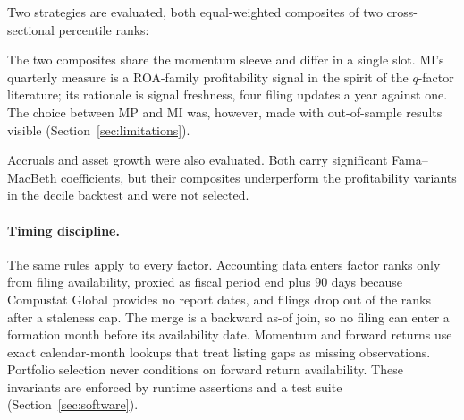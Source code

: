 \documentclass[11pt,a4paper]{article}
\begin{document}
Two strategies are evaluated, both equal-weighted composites of
two cross-sectional percentile ranks:

\begin{center}
\end{center}

The two composites share the momentum sleeve and differ in a single
slot. MI's quarterly measure is a ROA-family profitability signal in the
spirit of the $q$-factor literature; its rationale is signal freshness,
four filing updates a year against one. The choice between MP and MI
was, however, made with out-of-sample results visible
(Section~\ref{sec:limitations}).

Accruals \citep{sloan1996} and asset growth \citep{cooper2008} were also
evaluated. Both carry significant Fama--MacBeth coefficients, but their
composites underperform the profitability variants in the decile backtest and
were not selected.

\paragraph{Timing discipline.} The same rules apply to every factor.
Accounting data enters factor ranks only from
filing availability, proxied as fiscal period end plus 90 days
because Compustat Global provides no report dates, and filings drop out of
the ranks after a staleness cap. The merge is a backward as-of join, so no
filing can enter a formation month before its availability date. Momentum and forward returns use exact
calendar-month lookups that treat listing gaps as missing observations.
Portfolio selection never conditions on forward
return availability. These invariants are enforced by runtime assertions and
a test suite (Section~\ref{sec:software}).
\end{document}

